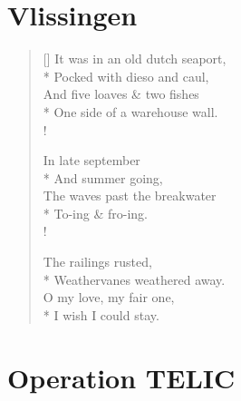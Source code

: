 \documentclass[openany]{amsbook}
\newcommand{\poeticmarginnote}[1]{\marginnote{\footnotesize #1}}
\begin{document}
\chapter*{Vlissingen}

\settowidth{\versewidth}{It was in an old dutch seaport}
\begin{verse}[\versewidth]
It was in an old dutch seaport,\\*
\vin Pocked with dieso and caul,\\
And five loaves \& two fishes\\*
\vin One side of a warehouse wall.\\!

In late september\\*
\vin And summer going,\\
The waves past the breakwater\\*
\vin To-ing \& fro-ing.\\!

The railings rusted,\\*
\vin Weathervanes weathered away.\\
O my love, my fair one,\poeticmarginnote{ER}\\*
\vin I wish I could stay.
\end{verse}


\chapter*{Operation TELIC}
\end{document}
